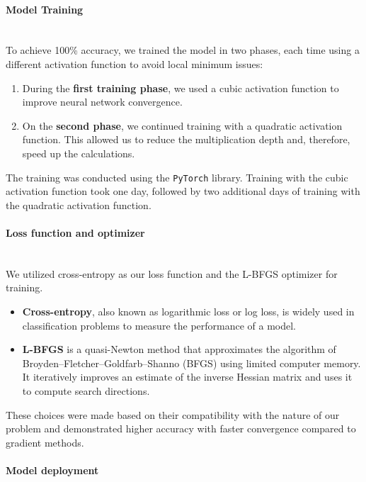 \documentclass[article]{iacrtrans}
\begin{document}
\paragraph{Model Training}\mbox{}\\


To achieve 100\% accuracy, we trained the model in two phases, each time using a different activation function to avoid local minimum issues:

\begin{enumerate}
    \item During the \textbf{first training phase}, we used a cubic activation function to improve neural network convergence.
    \item On the \textbf{second phase}, we continued training with a quadratic activation function. This allowed us to reduce the multiplication depth and, therefore, speed up the calculations.
\end{enumerate}
The training was conducted using the \verb|PyTorch| library. Training with the cubic activation function took one day, followed by two additional days of training with the quadratic activation function.

\paragraph{Loss function and optimizer}\mbox{}\\

We utilized cross-entropy as our loss function and the L-BFGS optimizer for training.

\begin{itemize}
    \item \textbf{Cross-entropy}, also known as logarithmic loss or log loss, is widely used in classification problems to measure the performance of a model.
    \item \textbf{L-BFGS} is a quasi-Newton method that approximates the algorithm of Broyden–Fletcher–Goldfarb–Shanno (BFGS) using limited computer memory. It iteratively improves an estimate of the inverse Hessian matrix and uses it to compute search directions.
\end{itemize}
These choices were made based on their compatibility with the nature of our problem and demonstrated higher accuracy with faster convergence compared to gradient methods.

\paragraph{Model deployment}\mbox{}\\
\end{document}
